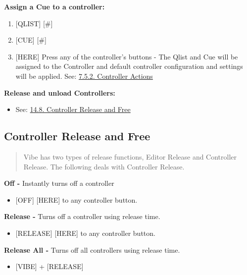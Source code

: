 \documentclass[
]{article}
\providecommand{\tightlist}{%
  \setlength{\itemsep}{0pt}\setlength{\parskip}{0pt}}
\begin{document}
\textbf{Assign a Cue to a controller:}

\begin{enumerate}
\def\labelenumi{\arabic{enumi}.}
\item
  {[}QLIST{]} {[}\#{]}
\item
  {[}CUE{]} {[}\#{]}
\item
  {[}HERE{]} Press any of the controller's buttons - The Qlist and Cue will be assigned to the Controller and default controller configuration and settings will be applied. See: \href{https://vibemanual.compulite.com/system-default-settings.html\#controller-actions}{7.5.2. Controller Actions}
\end{enumerate}

\textbf{Release and unload Controllers:}

\begin{itemize}
\tightlist
\item
  See: \href{https://vibemanual.compulite.com/playing-back-cues-and-scenes.html\#controller-release-and-free}{14.8. Controller Release and Free}
\end{itemize}

\hypertarget{controller-release-and-free}{%
\subsection{Controller Release and Free}\label{controller-release-and-free}}

\begin{quote}
Vibe has two types of release functions, Editor Release and Controller Release. The following deals with Controller Release.
\end{quote}

\textbf{Off -} Instantly turns off a controller

\begin{itemize}
\tightlist
\item
  {[}OFF{]} {[}HERE{]} to any controller button.
\end{itemize}

\textbf{Release -} Turns off a controller using release time.

\begin{itemize}
\tightlist
\item
  {[}RELEASE{]} {[}HERE{]} to any controller button.
\end{itemize}

\textbf{Release All -} Turns off all controllers using release time.

\begin{itemize}
\tightlist
\item
  {[}VIBE{]} + {[}RELEASE{]}
\end{itemize}
\end{document}
